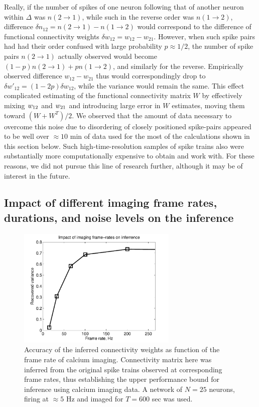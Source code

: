 Really, if the number of spikes of one neuron following that of another neuron within $\Delta$ was $n(2\rightarrow 1)$, while such in the reverse order was $n(1\rightarrow 2)$, difference $\delta n_{12} = n(2\rightarrow 1)-n(1\rightarrow 2)$ would correspond to the difference of functional connectivity weights $\delta w_{12}=w_{12}-w_{21}$. However, when such spike pairs had had their order confused with large probability $p\approx 1/2$, the number of spike pairs $n(2\rightarrow 1)$ actually observed would become $(1-p) n(2\rightarrow 1)+p n(1\rightarrow 2)$, and similarly for the reverse. Empirically observed difference $w_{12}-w_{21}$ thus would correspondingly drop to $\delta w'_{12}= (1-2p)\delta w_{12}$, while the variance would remain the same. This effect complicated estimating of the functional connectivity matrix $W$ by effectively mixing $w_{12}$ and $w_{21}$ and introducing large error in $W$ estimates, moving them toward $(W+W^T)/2$.
We observed that the amount of data necessary to overcome this noise due to disordering of closely positioned spike-pairs appeared to be well over $\approx 10$ min of data used for the most of the calculations shown in this section below. Such high-time-resolution samples of spike trains also were substantially more computationally expensive to obtain and work with. For these reasons, we did not pursue this line of research further, although it may be of interest in the future.

\subsection{Impact of different imaging frame rates, durations, and noise levels on the inference}
%
%
%
\begin{figure}[h]
\centering
\includegraphics[width=3in]{../figs/FigureA5_recvar}
\caption{Accuracy of the inferred connectivity weights as function of the frame rate of calcium imaging. Connectivity matrix here was inferred from the original spike trains observed at corresponding frame rates, thus establishing the upper performance bound for inference using calcium imaging data. A network of $N=25$ neurons, firing at $\approx 5$ Hz and imaged for $T=600$ sec was used.}
\label{fig:recvar}
\end{figure}

